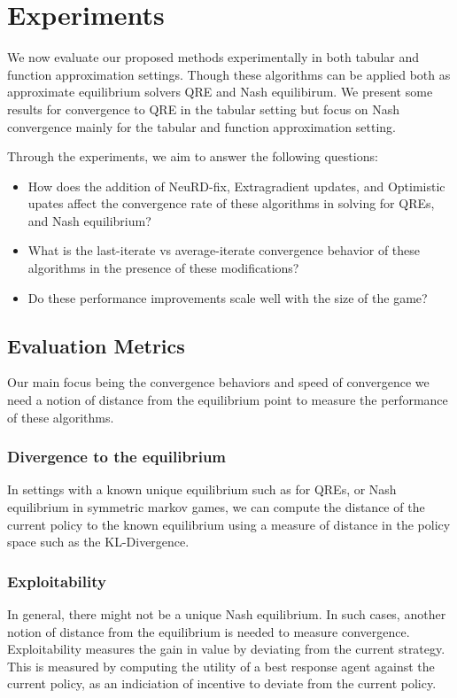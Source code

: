 \chapter{Experiments}

We now evaluate our proposed methods experimentally in both tabular and function approximation settings.
Though these algorithms can be applied both as approximate equilibrium solvers QRE and Nash equilibirum.
We present some results for convergence to QRE in the tabular setting but focus on Nash convergence mainly 
for the tabular and function approximation setting.

Through the experiments, we aim to answer the following questions:
\begin{itemize}
	\item How does the addition of NeuRD-fix, Extragradient updates, and Optimistic upates
	      affect the convergence rate of these algorithms in solving for QREs, and Nash equilibrium?
	\item What is the last-iterate vs average-iterate convergence behavior of these algorithms in the presence of these modifications?
	\item Do these performance improvements scale well with the size of the game?
\end{itemize}

\section{Evaluation Metrics}
Our main focus being the convergence behaviors and speed of convergence we need a notion of 
distance from the equilibrium point to measure the performance of these algorithms.

\subsection{Divergence to the equilibrium}
In settings with a known unique equilibrium such as for QREs, or Nash equilibrium in symmetric markov games, 
we can compute the distance of the current policy to the known equilibrium using a measure of distance in the policy space such as the KL-Divergence.

\subsection{Exploitability}
In general, there might not be a unique Nash equilibrium. 
In such cases, another notion of distance from the equilibrium is needed to measure convergence.
Exploitability measures the gain in value by deviating from the current strategy.
This is measured by computing the utility of a best response agent against the current policy, as an indiciation 
of incentive to deviate from the current policy.

